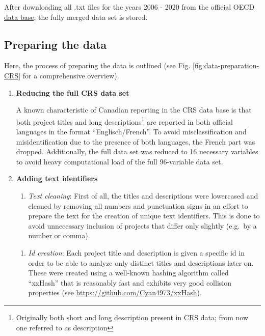 \documentclass[
]{article}
\providecommand{\tightlist}{%
  \setlength{\itemsep}{0pt}\setlength{\parskip}{0pt}}
\begin{document}
After downloading all .txt files for the years 2006 - 2020 from the official OECD \href{https://stats.oecd.org/DownloadFiles.aspx?DatasetCode=CRS1}{data base}, the fully merged data set is stored.

\hypertarget{preparing-the-data}{%
\subsection{Preparing the data}\label{preparing-the-data}}

Here, the process of preparing the data is outlined (see Fig. \ref{fig:data-preparation-CRS} for a comprehensive overview).

\begin{enumerate}
\def\labelenumi{\arabic{enumi}.}
\item
  \textbf{Reducing the full CRS data set}

  A known characteristic of Canadian reporting in the CRS data base is that both project titles and long descriptions\footnote{Originally both short and long description present in CRS data; from now one referred to as description} are reported in both official languages in the format ``Englisch/French''. To avoid misclassification and misidentification due to the presence of both languages, the French part was dropped. Additionally, the full data set was reduced to 16 necessary variables to avoid heavy computational load of the full 96-variable data set.
\item
  \textbf{Adding text identifiers}

  \begin{enumerate}
  \def\labelenumii{\roman{enumii}.}
  \tightlist
  \item
    \emph{Text cleaning}: First of all, the titles and descriptions were lowercased and cleaned by removing all numbers and punctuation signs in an effort to prepare the text for the creation of unique text identifiers. This is done to avoid unnecessary inclusion of projects that differ only slightly (e.g.~by a number or comma).
  \end{enumerate}

  \begin{enumerate}
  \def\labelenumii{\roman{enumii}.}
  \setcounter{enumii}{1}
  \tightlist
  \item
    \emph{Id creation}: Each project title and description is given a specific id in order to be able to analyze only distinct titles and descriptions later on. These were created using a well-known hashing algorithm called ``xxHash'' that is reasonably fast and exhibits very good collision properties (see \url{https://github.com/Cyan4973/xxHash}).
  \end{enumerate}


\end{enumerate}
\end{document}
